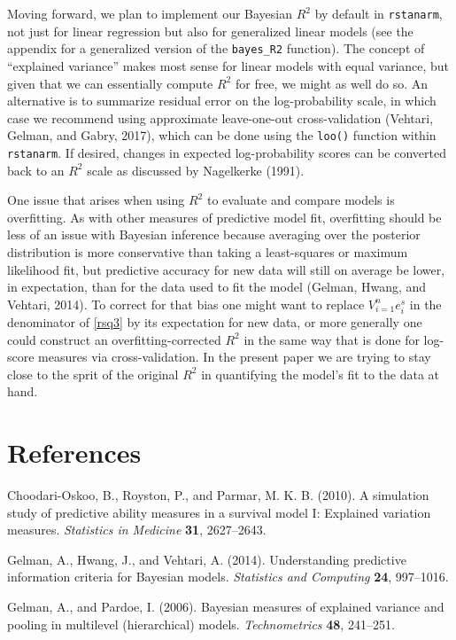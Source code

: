 \documentclass[11pt]{article}
\begin{document}
Moving forward, we plan to implement our Bayesian $R^2$ by default in
{\tt rstanarm}, not just for linear regression but also for generalized linear
models (see the appendix for a generalized version of the
\verb#bayes_R2# function). The concept of ``explained variance'' makes most
sense for linear models with equal variance, but given that we can essentially
compute $R^2$ for free, we might as well do so.  An alternative is to summarize
residual error on the log-probability scale, in which case we recommend using
approximate leave-one-out cross-validation (Vehtari, Gelman, and Gabry, 2017),
which can be done using the {\tt loo()} function within {\tt rstanarm}.   If
desired, changes in expected log-probability scores can be converted back to an
$R^2$ scale as discussed by Nagelkerke (1991).

One issue that arises when using $R^2$ to evaluate and compare models is
overfitting.  As with other measures of predictive model fit, overfitting should
be less of an issue with Bayesian inference because averaging over the posterior
distribution is more conservative than taking a least-squares or maximum
likelihood fit, but predictive accuracy for new data will still on average be
lower, in expectation, than for the data used to fit the model (Gelman, Hwang,
and Vehtari, 2014).  To correct for that bias one might want to replace
$V_{i=1}^n e_i^s$ in the denominator of \eqref{rsq3} by its expectation for new
data, or more generally one could construct an overfitting-corrected $R^2$ in
the same way that is done for log-score measures via cross-validation.  In the
present paper we are trying to stay close to the sprit of the original $R^2$ in
quantifying the model's fit to the data at hand.


\section*{References}

\noindent

\bibitem Choodari-Oskoo, B., Royston, P., and Parmar, M. K. B. (2010).  A simulation study of predictive ability measures in a survival model I: Explained variation measures.  {\em Statistics in Medicine} {\bf 31}, 2627--2643.

\bibitem Gelman, A., Hwang, J., and Vehtari, A. (2014).  Understanding predictive information criteria for Bayesian models. {\em Statistics and Computing} {\bf 24}, 997--1016.

\bibitem Gelman, A., and Pardoe, I. (2006).  Bayesian measures of explained variance and pooling in multilevel (hierarchical) models. {\em Technometrics} {\bf 48}, 241--251.
\end{document}
